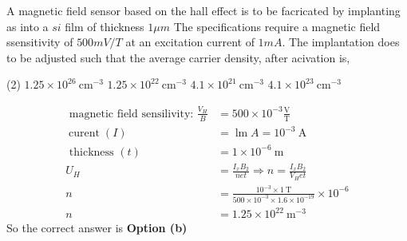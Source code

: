 \begin{exercise}
	A magnetic field sensor based on the hall effect is to be facricated by implanting as into a $si$ film of thickness $1\mu m$
	The specifications require a magnetic field ssensitivity of $500 mV/T$ at an excitation current of $1 mA$. The implantation does to be adjusted such that the average carrier density, after acivation is,
	 \begin{tasks}(2)
		\task[\textbf{a.}] $1.25 \times 10^{26} \mathrm{~cm}^{-3}$
		\task[\textbf{b.}]$1.25 \times 10^{22} \mathrm{~cm}^{-3}$
		\task[\textbf{c.}]$4.1 \times 10^{21} \mathrm{~cm}^{-3}$
		\task[\textbf{d.}] $4.1 \times 10^{23} \mathrm{~cm}^{-3}$
	\end{tasks}
\end{exercise}
\begin{answer}
	\begin{align*}\text { magnetic field sensilivity: } \frac{V_{H}}{B}&=500 \times 10^{-3} \frac{\mathrm{V}}{\mathrm{T}}\\
	\operatorname{curent}(I)&=\operatorname{lm} A=10^{-3} \mathrm{~A}\\
	\text { thickness }(t)&=1 \times 10^{-6} \mathrm{~m}\\
	U_{H}&=\frac{I_{x} B_{2}}{n e t} \Rightarrow n=\frac{I_{x} B_{2}}{V_{H} e t}\\
	n&=\frac{10^{-3} \times 1 \mathrm{~T}}{500 \times 10^{-3} \times 1.6 \times 10^{-19}} \times 10^{-6} \\
	n&=1.25 \times 10^{22} \mathrm{~m}^{-3}
	\end{align*}
		So the correct answer is \textbf{Option (b)}
\end{answer}



